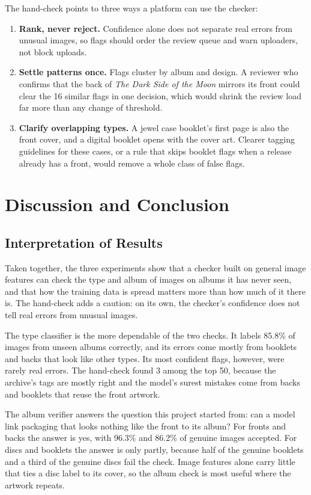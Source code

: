 \documentclass[conference]{IEEEtran}
\begin{document}
The hand-check points to three ways a platform can use the checker:
\begin{enumerate}
\item \textbf{Rank, never reject.} Confidence alone does not separate real errors from unusual images, so flags should order the review queue and warn uploaders, not block uploads.
\item \textbf{Settle patterns once.} Flags cluster by album and design. A reviewer who confirms that the back of \textit{The Dark Side of the Moon} mirrors its front could clear the 16 similar flags in one decision, which would shrink the review load far more than any change of threshold.
\item \textbf{Clarify overlapping types.} A jewel case booklet's first page is also the front cover, and a digital booklet opens with the cover art. Clearer tagging guidelines for these cases, or a rule that skips booklet flags when a release already has a front, would remove a whole class of false flags.
\end{enumerate}

\section{Discussion and Conclusion}\label{sec:discussion}

\subsection{Interpretation of Results}\label{sec:interpretation}
Taken together, the three experiments show that a checker built on general image features can check the type and album of images on albums it has never seen, and that how the training data is spread matters more than how much of it there is. The hand-check adds a caution: on its own, the checker's confidence does not tell real errors from unusual images.

The type classifier is the more dependable of the two checks. It labels 85.8\% of images from unseen albums correctly, and its errors come mostly from booklets and backs that look like other types. Its most confident flags, however, were rarely real errors. The hand-check found 3 among the top 50, because the archive's tags are mostly right and the model's surest mistakes come from backs and booklets that reuse the front artwork.

The album verifier answers the question this project started from: can a model link packaging that looks nothing like the front to its album? For fronts and backs the answer is yes, with 96.3\% and 86.2\% of genuine images accepted. For discs and booklets the answer is only partly, because half of the genuine booklets and a third of the genuine discs fail the check. Image features alone carry little that ties a disc label to its cover, so the album check is most useful where the artwork repeats.
\end{document}
